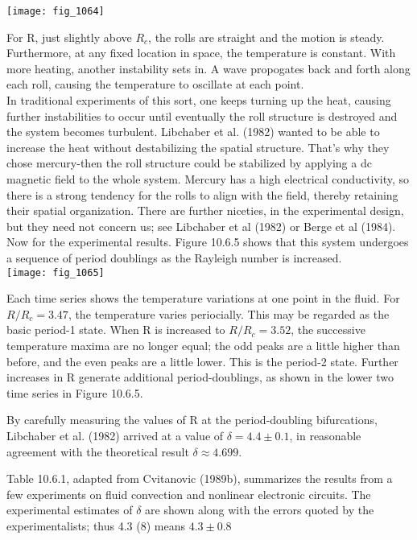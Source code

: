 \documentclass{article}
\newcommand\tab[1][1cm]{\hspace*{#1}}
\begin{document}
\texttt{[image: fig\_1064]}

For R, just slightly above $R_{c}$, the rolls are straight and the motion is steady. Furthermore, at any fixed location in space, the temperature is constant. With more heating, another instability sets in. A wave propogates back and forth along each roll, causing the temperature to oscillate at each point. \\ \tab
In traditional experiments of this sort, one keeps turning up the heat, causing further instabilities to occur until eventually the roll structure is destroyed and the system becomes turbulent. Libchaber et al. (1982) wanted to be able to increase the heat without destabilizing the spatial structure. That's why they chose mercury-then the roll structure could be stabilized by applying a dc magnetic field to the whole system. Mercury has a high electrical conductivity, so there is a strong tendency for the rolls to align with the field, thereby retaining their spatial organization. There are further niceties, in the experimental design, but they need not concern us; see Libchaber et al (1982) or Berge et al (1984). \\ \tab
Now for the experimental results. Figure 10.6.5 shows that this system undergoes a sequence of period doublings as the Rayleigh number is increased. \\

\texttt{[image: fig\_1065]}

Each time series shows the temperature variations at one point in the fluid. For $R/R_{c}=3.47$, the temperature varies periocially. This may be regarded as the basic period-1 state. When R is increased to $R/R_{c}=3.52$, the successive temperature maxima are no longer equal; the odd peaks are a little higher than before, and the even peaks are a little lower. This is the period-2 state. Further increases in R generate additional period-doublings, as shown in the lower two time series in Figure 10.6.5. \\ \tab

By carefully measuring the values of R at the period-doubling bifurcations, Libchaber et al. (1982) arrived at a value of $\delta = 4.4 \pm 0.1$, in reasonable agreement with the theoretical result $\delta \approx 4.699$. \\ \tab

Table 10.6.1, adapted from Cvitanovic (1989b), summarizes the results from a few experiments on fluid convection and nonlinear electronic circuits. The experimental estimates of $\delta$ are shown along with the errors quoted by the experimentalists; thus 4.3 (8) means $4.3 \pm 0.8$ \\
\end{document}
